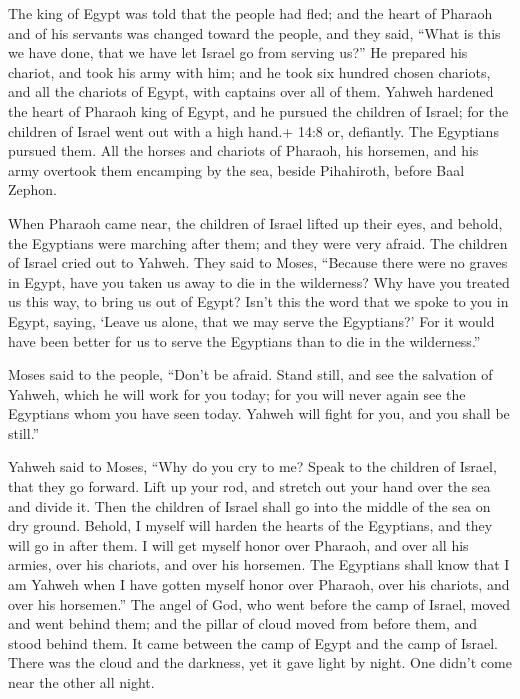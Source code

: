  The king of Egypt was told that the people had fled; and
the heart of Pharaoh and of his servants was changed toward the people,
and they said, ``What is this we have done, that we have let Israel go
from serving us?''  He prepared his chariot, and took his
army with him;  and he took six hundred chosen chariots, and
all the chariots of Egypt, with captains over all of them. 
Yahweh hardened the heart of Pharaoh king of Egypt, and he pursued the
children of Israel; for the children of Israel went out with a high
hand.+ 14:8 or, defiantly.  The Egyptians pursued them. All
the horses and chariots of Pharaoh, his horsemen, and his army overtook
them encamping by the sea, beside Pihahiroth, before Baal Zephon.

 When Pharaoh came near, the children of Israel lifted up
their eyes, and behold, the Egyptians were marching after them; and they
were very afraid. The children of Israel cried out to Yahweh.
 They said to Moses, ``Because there were no graves in
Egypt, have you taken us away to die in the wilderness? Why have you
treated us this way, to bring us out of Egypt?  Isn't this
the word that we spoke to you in Egypt, saying, `Leave us alone, that we
may serve the Egyptians?' For it would have been better for us to serve
the Egyptians than to die in the wilderness.''

 Moses said to the people, ``Don't be afraid. Stand still,
and see the salvation of Yahweh, which he will work for you today; for
you will never again see the Egyptians whom you have seen today.
 Yahweh will fight for you, and you shall be still.''

 Yahweh said to Moses, ``Why do you cry to me? Speak to the
children of Israel, that they go forward.  Lift up your
rod, and stretch out your hand over the sea and divide it. Then the
children of Israel shall go into the middle of the sea on dry ground.
 Behold, I myself will harden the hearts of the Egyptians,
and they will go in after them. I will get myself honor over Pharaoh,
and over all his armies, over his chariots, and over his horsemen.
 The Egyptians shall know that I am Yahweh when I have
gotten myself honor over Pharaoh, over his chariots, and over his
horsemen.''  The angel of God, who went before the camp of
Israel, moved and went behind them; and the pillar of cloud moved from
before them, and stood behind them.  It came between the
camp of Egypt and the camp of Israel. There was the cloud and the
darkness, yet it gave light by night. One didn't come near the other all
night.

